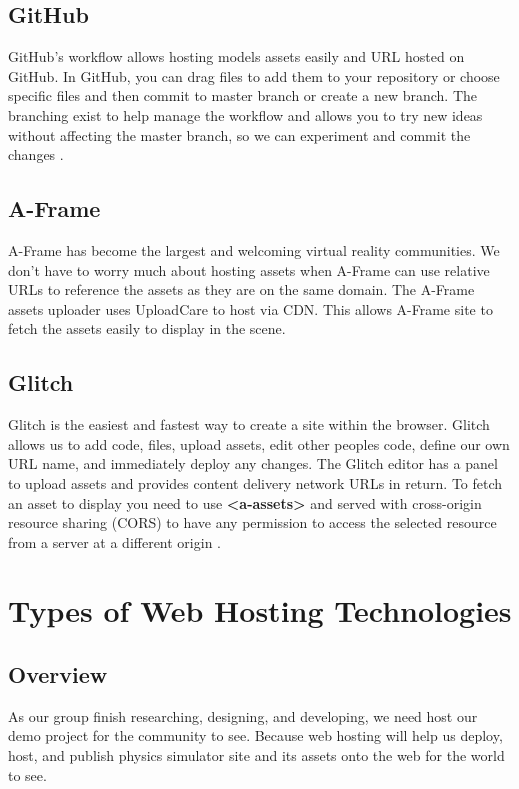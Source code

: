\subsection{GitHub}
GitHub's workflow allows hosting models assets easily and URL hosted on GitHub. In GitHub, you can drag files to add them to your repository or choose specific files and then commit to master branch or create a new branch. The branching exist to help manage the workflow and allows you to try new ideas without affecting the master branch, so we can experiment and commit the changes \cite{aframe}.  

\subsection{A-Frame}
A-Frame has become the largest and welcoming virtual reality communities. We don't have to worry much about hosting assets when A-Frame can use relative URLs to reference the assets as they are on the same domain. The A-Frame assets uploader uses UploadCare to host via CDN. This allows A-Frame site to fetch the assets easily to display in the scene\cite{aframe}.

\subsection{Glitch}
Glitch is the easiest and fastest way to create a site within the browser. Glitch allows us to add code, files, upload assets, edit other peoples code, define our own URL name, and immediately deploy any changes. The Glitch editor has a panel to upload assets and provides content delivery network URLs in return. To fetch an asset to display you need to use \textbf{<a-assets>} and served with cross-origin resource sharing (CORS) to have any permission to access the selected resource from a server at a different origin \cite{aframe}.

\section{Types of Web Hosting Technologies}
\subsection{Overview}
As our group finish researching, designing, and developing, we need host our demo project for the community to see. Because web hosting will help us deploy, host, and publish physics simulator site and its assets onto the web for the world to see. 

